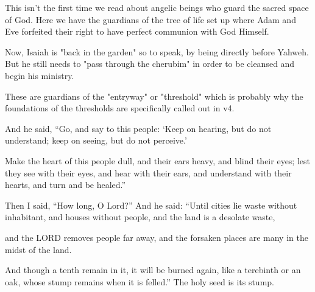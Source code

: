 \documentclass[11pt]{article}
\begin{document}
{\vspace{2em}}

This isn't the first time we read about angelic beings who guard the sacred space of God. Here we have the guardians of the tree of life set up where Adam and Eve forfeited their right to have perfect communion with God Himself.

Now, Isaiah is "back in the garden" so to speak, by being directly before Yahweh. But he still needs to "pass through the cherubim" in order to be cleansed and begin his ministry.

These are guardians of the "entryway" or "threshold" which is probably why the foundations of the thresholds are specifically called out in v4.



\begin{biblicaloutline}[Isaiah 6:9-13]
    

    \begin{versesection}{2em}
         And he said, ``Go, and say to this people: `Keep on hearing, but do not understand; keep on seeing, but do not perceive.'

         Make the heart of this people dull, and their ears heavy, and blind their eyes; lest they see with their eyes, and hear with their ears, and understand with their hearts, and turn and be healed.''
    \end{versesection}
    
    
    \begin{versesection}{2em}
         Then I said, ``How long, O Lord?'' And he said: ``Until cities lie waste without inhabitant, and houses without people, and the land is a desolate waste,

         and the LORD removes people far away, and the forsaken places are many in the midst of the land.

         And though a tenth remain in it, it will be burned again, like a terebinth or an oak, whose stump remains when it is felled.'' The holy seed is its stump.
    \end{versesection}

\end{biblicaloutline}

{\vspace{2em}}
\end{document}

